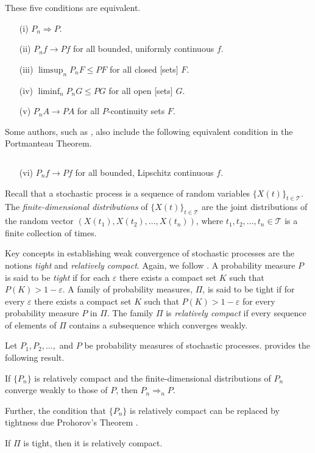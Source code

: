 \begin{thm}
	These five conditions are equivalent.
	\begin{enumerate}
		\item[(i)] \(P_n\Rightarrow P\). 
		\item[(ii)] \(P_nf\to Pf\) for all bounded, uniformly continuous \(f\).
		\item[(iii)] \(\limsup_n P_n F \leq P F\) for all closed [sets] \(F\).
		\item[(iv)] \(\liminf_n P_n G \leq P G\) for all open [sets] \(G\).
		\item[(v)] \(P_n A \to P A\) for all \(P\)-continuity sets \(F\).
	\end{enumerate}
\end{thm}
Some authors, such as \cite{portmanteaubook}, also include the following equivalent condition in the Portmanteau Theorem. 
\begin{thm}\label{thm: Portmanteau}
	\(\,\)
	\begin{enumerate}
		\item[(vi)] \(P_nf \to P f\) for all bounded, Lipschitz continuous \(f\).
	\end{enumerate}
\end{thm}

Recall that a stochastic process is a sequence of random variables \(\{X(t)\}_{t\in\mathcal T}\). The \emph{finite-dimensional distributions} of \(\{X(t)\}_{t\in\mathcal T}\) are the joint distributions of the random vector \((X(t_1),X(t_2),...,X(t_n))\), where \(t_1,t_2,...,t_n\in \mathcal T\) is a finite collection of times. 

Key concepts in establishing weak convergence of stochastic processes are the notions \emph{tight} and \emph{relatively compact}. Again, we follow \cite{billingsleyconvergence}. A probability measure \(P\) is said to be \emph{tight} if for each \(\varepsilon\) there exists a compact set \(K\) such that \(P(K)>1-\varepsilon\). A family of probability measures, \(\Pi\), is said to be tight if for every \(\varepsilon\) there exists a compact set \(K\) such that \(P(K)>1-\varepsilon\) for every probability measure \(P\) in \(\Pi\). The family \(\Pi\) is \emph{relatively compact} if every sequence of elements of \(\Pi\) contains a subsequence which converges weakly. 

Let \(P_1,P_2,...,\) and \(P\) be probability measures of stochastic processes. \cite{billingsleyconvergence} provides the following result.
\begin{thm}\label{thm: aofaa}
	If \(\{P_n\}\) is relatively compact and the finite-dimensional distributions of \(P_n\) converge weakly to those of \(P\), then \(P_n\Rightarrow_n P\). 
\end{thm}
Further, the condition that \(\{P_n\}\) is relatively compact can be replaced by tightness due Prohorov's Theorem \citep{billingsleyconvergence}. 
\begin{thm}
	If \(\Pi\) is tight, then it is relatively compact.
\end{thm}


